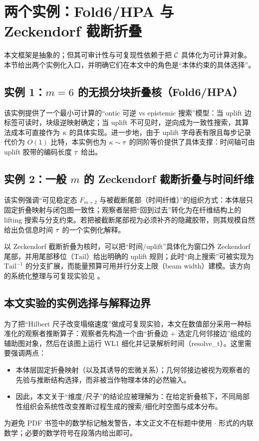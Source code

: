 \section{两个实例：Fold6/HPA 与 Zeckendorf 截断折叠}

本文框架是抽象的；但其可审计性与可复现性依赖于把 \(\mathcal{C}\) 具体化为可计算对象。本节给出两个实例化入口，并明确它们在本文中的角色是“本体约束的具体选择”。

\subsection{实例 1：\(m=6\) 的无损分块折叠核（Fold6/HPA）}

该实例提供了一个最小可计算的“ontic 可逆 vs epistemic 搜索”模型：当 uplift 边标签可读时，块级逆映射确定；当 uplift 不可见时，逆向成为一致性搜索，其算法成本可直接作为 \(\kappa\) 的具体实现。进一步地，由于 uplift 字母表有限且每步记录代价为 \(O(1)\) 比特，本实例也为 \(\kappa\sim\tau\) 的同阶等价提供了具体支撑：时间轴可由 uplift 胶带的编码长度 \(\tau\) 给出。

\subsection{实例 2：一般 \(m\) 的 Zeckendorf 截断折叠与时间纤维}

该实例强调“可见稳定态 \(F_{m+2}\) 与被截断尾部（时间纤维）”的组织方式：本体层只固定折叠映射与闭包图一致性；观察者层把“回到过去”转化为在纤维结构上的 lifting 搜索与分支约束。若把被截断尾部视为必须补齐的隐藏胶带，则其规模自然给出负信息时间 \(\tau\) 的一个实例化解释。

\begin{remark}
以 Zeckendorf 截断折叠为核时，可以把“时间/uplift”具体化为窗口外 Zeckendorf 尾部，并用尾部移位（\(\mathrm{Tail}\)）给出明确的 uplift 规则；此时“向上搜索”可被实现为 \(\mathrm{Tail}^{-1}\) 的分支扩展，而能量预算可用并行分支上限（beam width）建模。该方向的系统化整理与可复现实验见 。
\end{remark}

\subsection{本文实验的实例选择与解释边界}

为了把“Hilbert 尺子改变塌缩速度”做成可复现实验，本文在数值部分采用一种标准化的观察者推断算子：观察者先构造一个由“折叠边 + 选定几何邻接边”组成的辅助图对象，然后在该图上运行 WL1 细化并记录解析时间（resolve\_t）。这里需要强调两点：
\begin{itemize}
  \item 本体层固定折叠映射（以及其诱导的宏微关系）；几何邻接边被视为观察者的先验与推断结构选择，而非被当作物理本体的必然输入。
  \item 因此，本文关于“维度/尺子”的结论应被理解为：在给定折叠核下，不同局部性组织会系统性改变推断过程生成的搜索/细化时空图与成本分布。
\end{itemize}

\begin{remark}
为避免 PDF 书签中的数学标记触发警告，本文正文不在标题中使用 \(\cdot\) 形式的内联数学；必要的数学符号在段落内给出即可。
\end{remark}

